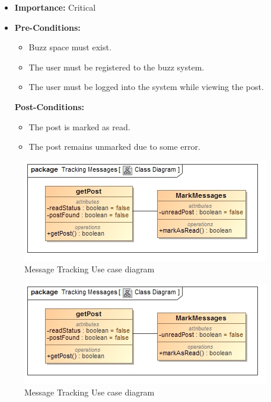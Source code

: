 \documentclass[11pt]{article}
\begin{document}
\begin{enumerate}
\begin{itemize}
\item \textbf{Importance:} Critical
\item \textbf{Pre-Conditions: }
	\begin{itemize}
	\item Buzz space must exist.
	\item The user must be registered to the buzz system.
	\item The user must be logged into the system while viewing the post.
	\end{itemize}

\textbf{Post-Conditions: }
	\begin{itemize}
	\item The post is marked as read.
	\item The post remains unmarked due to some error.
	\end{itemize}

\end{itemize}

\graphicspath{ {../Diagrams/Kyhle/Class_Diagrams/} }	  	
\begin{figure}[H]	
    	\includegraphics[scale=0.5]{messageTracking.jpg}
    	\caption{Message Tracking Use case diagram}
	\end{figure}

\graphicspath{ {../Diagrams/Kyhle/Use_Case_Diagrams/} }	  	
\begin{figure}[H]	
    	\includegraphics[scale=0.5]{messageTracking.jpg}
    	\caption{Message Tracking Use case diagram}
	\end{figure}
	

\end{enumerate}
\end{document}
